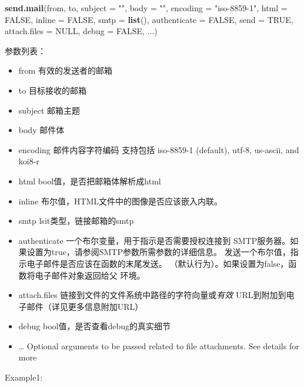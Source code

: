 \documentclass[]{book}
\newenvironment{Shaded}{\begin{snugshade}}{\end{snugshade}}
\newcommand{\KeywordTok}[1]{\textcolor[rgb]{0.13,0.29,0.53}{\textbf{#1}}}
\newcommand{\DataTypeTok}[1]{\textcolor[rgb]{0.13,0.29,0.53}{#1}}
\newcommand{\StringTok}[1]{\textcolor[rgb]{0.31,0.60,0.02}{#1}}
\newcommand{\OtherTok}[1]{\textcolor[rgb]{0.56,0.35,0.01}{#1}}
\newcommand{\NormalTok}[1]{#1}
\theoremstyle{definition}
\theoremstyle{definition}
\theoremstyle{definition}
\theoremstyle{remark}
\begin{document}
\begin{Shaded}
\begin{Highlighting}[]
\KeywordTok{send.mail}\NormalTok{(from, to, }\DataTypeTok{subject =} \StringTok{""}\NormalTok{, }\DataTypeTok{body =} \StringTok{""}\NormalTok{, }\DataTypeTok{encoding =} \StringTok{"iso-8859-1"}\NormalTok{,}
\DataTypeTok{html =} \OtherTok{FALSE}\NormalTok{, }\DataTypeTok{inline =} \OtherTok{FALSE}\NormalTok{, }\DataTypeTok{smtp =} \KeywordTok{list}\NormalTok{(), }\DataTypeTok{authenticate =} \OtherTok{FALSE}\NormalTok{,}
\DataTypeTok{send =} \OtherTok{TRUE}\NormalTok{, }\DataTypeTok{attach.files =} \OtherTok{NULL}\NormalTok{, }\DataTypeTok{debug =} \OtherTok{FALSE}\NormalTok{, ...)}
\end{Highlighting}
\end{Shaded}

参数列表：

\begin{itemize}
\item
  from 有效的发送者的邮箱
\item
  to 目标接收的邮箱
\item
  subject 邮箱主题
\item
  body 邮件体
\item
  encoding 邮件内容字符编码 支持包括 iso-8859-1 (default), utf-8,
  us-ascii, and koi8-r
\item
  html bool值，是否把邮箱体解析成html
\item
  inline 布尔值，HTML文件中的图像是否应该嵌入内联。
\item
  smtp lsit类型，链接邮箱的smtp
\item
  authenticate 一个布尔变量，用于指示是否需要授权连接到
  SMTP服务器。如果设置为true，请参阅SMTP参数所需参数的详细信息。
  发送一个布尔值，指示电子邮件是否应该在函数的末尾发送。
  （默认行为）。如果设置为false，函数将电子邮件对象返回给父 环境。
\item
  attach.files 链接到文件的文件系统中路径的字符向量或\emph{有效}
  URL到附加到电子邮件（详见更多信息附加URL）
\item
  debug bool值，是否查看debug的真实细节
\item
  \ldots{} Optional arguments to be passed related to file attachments.
  See details for more
\end{itemize}

Example1:
\end{document}
